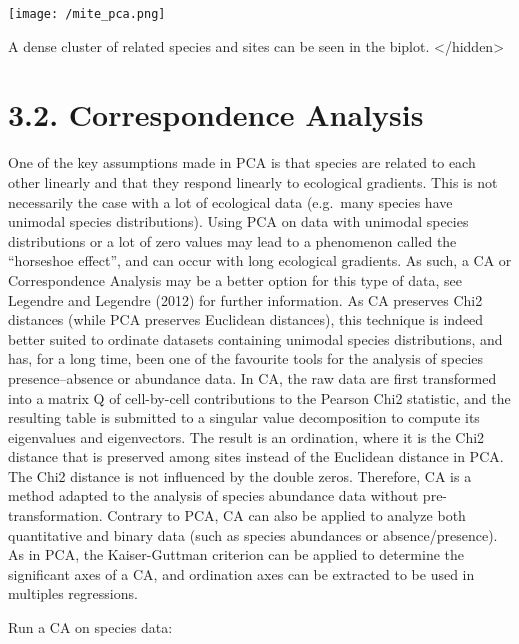 \documentclass[
]{book}
\begin{document}
\texttt{[image: /mite\_pca.png]}

A dense cluster of related species and sites can be seen in the biplot.
\textless/hidden\textgreater{}

\hypertarget{correspondence-analysis}{%
\section{3.2. Correspondence Analysis}\label{correspondence-analysis}}

One of the key assumptions made in PCA is that species are related to
each other linearly and that they respond linearly to ecological
gradients. This is not necessarily the case with a lot of ecological
data (e.g.~many species have unimodal species distributions). Using PCA
on data with unimodal species distributions or a lot of zero values may
lead to a phenomenon called the ``horseshoe effect'', and can occur with
long ecological gradients. As such, a CA or Correspondence Analysis may
be a better option for this type of data, see Legendre and Legendre
(2012) for further information. As CA preserves Chi2 distances (while
PCA preserves Euclidean distances), this technique is indeed better
suited to ordinate datasets containing unimodal species distributions,
and has, for a long time, been one of the favourite tools for the
analysis of species presence--absence or abundance data. In CA, the raw
data are first transformed into a matrix Q of cell-by-cell contributions
to the Pearson Chi2 statistic, and the resulting table is submitted to a
singular value decomposition to compute its eigenvalues and
eigenvectors. The result is an ordination, where it is the Chi2 distance
that is preserved among sites instead of the Euclidean distance in PCA.
The Chi2 distance is not influenced by the double zeros. Therefore, CA
is a method adapted to the analysis of species abundance data without
pre-transformation. Contrary to PCA, CA can also be applied to analyze
both quantitative and binary data (such as species abundances or
absence/presence). As in PCA, the Kaiser-Guttman criterion can be
applied to determine the significant axes of a CA, and ordination axes
can be extracted to be used in multiples regressions.

Run a CA on species data:
\end{document}
